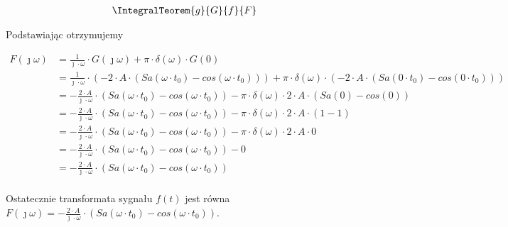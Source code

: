 \begin{task}
\begin{align*}
\IntegralTeorem{g}{G}{f}{F}
\end{align*}
 
 Podstawiając otrzymujemy
 
\begin{align*}
F(\jmath \omega) &= \frac{1}{\jmath \cdot \omega} \cdot G(\jmath \omega) + \pi \cdot \delta(\omega) \cdot G(0)\\
&=\frac{1}{\jmath \cdot \omega} \cdot \left(-2\cdot A \cdot \left( Sa\left( \omega \cdot t_0\right) - cos\left( \omega \cdot t_0\right) \right)\right) + \pi \cdot \delta(\omega) \cdot \left( -2\cdot A \cdot \left( Sa\left( 0 \cdot t_0\right) - cos\left( 0 \cdot t_0\right) \right) \right)\\
&=-\frac{2\cdot A}{\jmath \cdot \omega} \cdot \left( Sa\left( \omega \cdot t_0\right) - cos\left( \omega \cdot t_0\right) \right) - \pi \cdot \delta(\omega) \cdot 2\cdot A \cdot \left( Sa\left(0\right) - cos\left( 0 \right) \right)\\
&=-\frac{2\cdot A}{\jmath \cdot \omega} \cdot \left( Sa\left( \omega \cdot t_0\right) - cos\left( \omega \cdot t_0\right) \right) - \pi \cdot \delta(\omega) \cdot 2\cdot A \cdot \left( 1 - 1 \right)\\
&=-\frac{2\cdot A}{\jmath \cdot \omega} \cdot \left( Sa\left( \omega \cdot t_0\right) - cos\left( \omega \cdot t_0\right) \right) - \pi \cdot \delta(\omega) \cdot 2\cdot A \cdot 0\\
&=-\frac{2\cdot A}{\jmath \cdot \omega} \cdot \left( Sa\left( \omega \cdot t_0\right) - cos\left( \omega \cdot t_0\right) \right) - 0 \\
&=-\frac{2\cdot A}{\jmath \cdot \omega} \cdot \left( Sa\left( \omega \cdot t_0\right) - cos\left( \omega \cdot t_0\right) \right)\\
\end{align*}


Ostatecznie transformata sygnału $f(t)$ jest równa $F(\jmath \omega)=-\frac{2\cdot A}{\jmath \cdot \omega} \cdot \left( Sa\left( \omega \cdot t_0\right) - cos\left( \omega \cdot t_0\right) \right)$.

\end{task}

